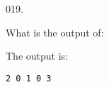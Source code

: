 \documentclass[]{book}
\newenvironment{Shaded}{}{}
\newcommand{\BuiltInTok}[1]{#1}
\newcommand{\DecValTok}[1]{\textcolor[rgb]{0.25,0.63,0.44}{#1}}
\newcommand{\NormalTok}[1]{#1}
\newcommand{\StringTok}[1]{\textcolor[rgb]{0.25,0.44,0.63}{#1}}
\begin{document}
\vspace{2mm}\noindent\hrulefill{}

\begin{minipage}{\linewidth}\noindent
{\tiny 019.}\\
\begin{minipage}[t]{.485\linewidth}

What is the output of:

\begin{framed}

\begin{Shaded}
\end{Shaded}

\end{framed}

\end{minipage}
\hfill
\begin{minipage}[t]{.485\linewidth}

The output is:

\begin{framed}

\begin{verbatim}
2 0 1 0 3 
\end{verbatim}

\end{framed}

\end{minipage}
\end{minipage}

\vspace{2mm}\noindent\hrulefill{}
\end{document}
